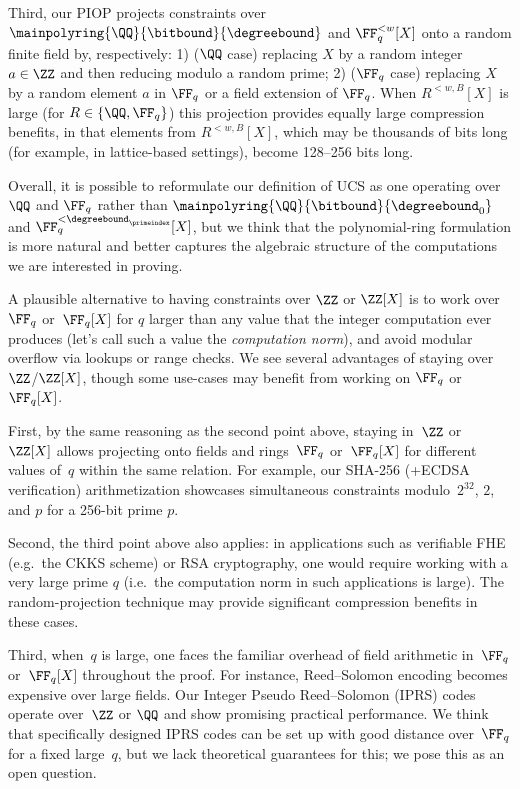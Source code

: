 Third, our PIOP projects constraints over $\mainpolyring{\QQ}{\bitbound}{\degreebound}$ and  $\FF_q^{<w}[X]$ onto a random finite field  by, respectively: 1) ($\QQ$ case)  replacing $X$ by a random integer $a\in \ZZ$ and then reducing modulo a random prime; 2) ($\FF_q$ case) replacing $X$ by a random element $a$ in $\FF_q$ or a field extension of $\FF_q$. 
When $R^{<w, B}[X]$ is  large (for $R\in \{\QQ,\FF_q\}$) this projection provides equally large compression benefits, in that elements from  $R^{<w, B}[X]$, which may be thousands of bits long (for example, in lattice-based settings), become 128--256 bits long.

Overall, it is possible to reformulate our definition of UCS as one operating over $\QQ$ and $\FF_q$ rather than $\mainpolyring{\QQ}{\bitbound}{\degreebound_0}$ and $\FF_q^{<\degreebound_\primeindex}[X]$, but we think that the polynomial-ring formulation is more natural and better captures the algebraic structure of the computations we are interested in proving. 

\medskip


A plausible alternative to having constraints over $\ZZ$ or $\ZZ[X]$ is to work over~$\FF_q$ or~$\FF_q[X]$ for $q$ larger than any value that the integer computation ever produces (let's call such a value the \emph{computation norm}), and avoid modular overflow via lookups or range checks.  We see several advantages of staying over~$\ZZ$/$\ZZ[X]$, though some use-cases may benefit from working on $\FF_q$ or $\FF_q[X]$.

First, by the same reasoning as the second point above, staying in~$\ZZ$ or~$\ZZ[X]$ allows projecting onto fields and rings~$\FF_q$ or~$\FF_q[X]$ for different values of~$q$ within the same relation. For example, our SHA-256 (+ECDSA verification) arithmetization showcases simultaneous constraints modulo~$2^{32}$, $2$, and $p$ for a 256-bit prime $p$.

Second, the third point above also applies: in applications such as verifiable FHE (e.g.\ the CKKS scheme) or RSA cryptography, one would require working with a very large prime $q$ (i.e.\ the computation norm in such applications is large). The random-projection technique may provide significant compression benefits in these cases.

Third, when~$q$ is large, one faces the familiar overhead of field arithmetic in~$\FF_q$ or~$\FF_q[X]$ throughout the proof. For instance, Reed--Solomon encoding becomes expensive over large fields. Our Integer Pseudo Reed--Solomon (IPRS) codes operate over~$\ZZ$ or $\QQ$ and show promising practical performance. We think that specifically designed IPRS codes can be set up with good distance over~$\FF_q$ for a fixed large~$q$, but we lack theoretical guarantees for this; we pose this as an open question.
  
